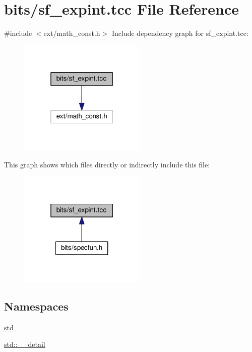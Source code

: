 \hypertarget{sf__expint_8tcc}{}\section{bits/sf\+\_\+expint.tcc File Reference}
\label{sf__expint_8tcc}
{\ttfamily \#include $<$ext/math\+\_\+const.\+h$>$}\newline
Include dependency graph for sf\+\_\+expint.\+tcc\+:
\nopagebreak
\begin{figure}[H]
\begin{center}
\leavevmode
\includegraphics[width=172pt]{sf__expint_8tcc__incl}
\end{center}
\end{figure}
This graph shows which files directly or indirectly include this file\+:
\nopagebreak
\begin{figure}[H]
\begin{center}
\leavevmode
\includegraphics[width=172pt]{sf__expint_8tcc__dep__incl}
\end{center}
\end{figure}
\subsection*{Namespaces}
\begin{DoxyCompactItemize}
\item 
 \hyperlink{namespacestd}{std}
\item 
 \hyperlink{namespacestd_1_1____detail}{std\+::\+\_\+\+\_\+detail}
\end{DoxyCompactItemize}
